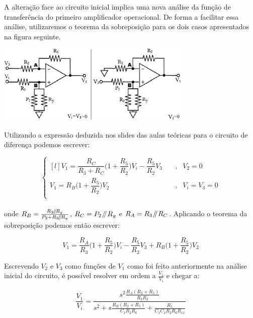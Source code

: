 \documentclass[a4paper,11pt]{report}
\newcommand{\parallelsum}{\mathbin{\!/\mkern-5mu/\!}} %
\begin{document}
A alteração face ao circuito inicial implica uma nova análise da função de transferência do primeiro amplificador operacional. De forma a facilitar essa análise, utilizaremos o teorema da sobreposição para os dois casos apresentados na figura seguinte.

\begin{center}
     \includegraphics[angle=0,width=0.7\textwidth]{cdifsobreposicao.png}
     \label{fig:cdifsobreposicao}
     \end{center}

Utilizando a expressão deduzida nos slides das aulas teóricas para o circuito de diferença podemos escrever:

\begin{equation*} 
\left\{ \begin{matrix*}[l]
V_1=\dfrac{R_C}{R_3+R_C}\bigg(1+\dfrac{R_5}{R_2}\bigg)V_i-\dfrac{R_5}{R_2}V_3\quad & , & V_2=0 \\[0.5cm]
V_1=R_B\bigg(1+\dfrac{R_5}{R_2}\bigg)V_2\quad & , & V_i=V_3=0 \\[0.5cm]
 \end{matrix*} \right.
\end{equation*}\\

onde $R_B=\frac{R_3\parallelsum R_y}{P_2+R_3\parallelsum R_y}$, $R_C=P_2\parallelsum R_y$ e $R_A=R_3\parallelsum R_C$. Aplicando o teorema da sobreposição podemos então escrever:

\begin{equation}
V_1=\dfrac{R_A}{R_3}\bigg(1+\dfrac{R_5}{R_2}\bigg)V_i-\dfrac{R_5}{R_2}V_3+R_B\bigg(1+\dfrac{R_5}{R_2}\bigg)V_2
\end{equation}

Escrevendo $V_2$ e $V_3$ como funções de $V_1$ como foi feito anteriormente na análise inicial do circuito, é possível resolver em ordem a $\frac{V_1}{V_i}$ e chegar a:

\begin{equation}
\dfrac{V_1}{V_i}=\dfrac{s^2\frac{R_A(R_2+R_5)}{R_3R_2}}{s^2+s\frac{R_B(R_2+R_5)}{C_1R_2R_6}+\frac{R_5}{C_1C_2R_2R_6R_{11}}}
\end{equation}
\end{document}
